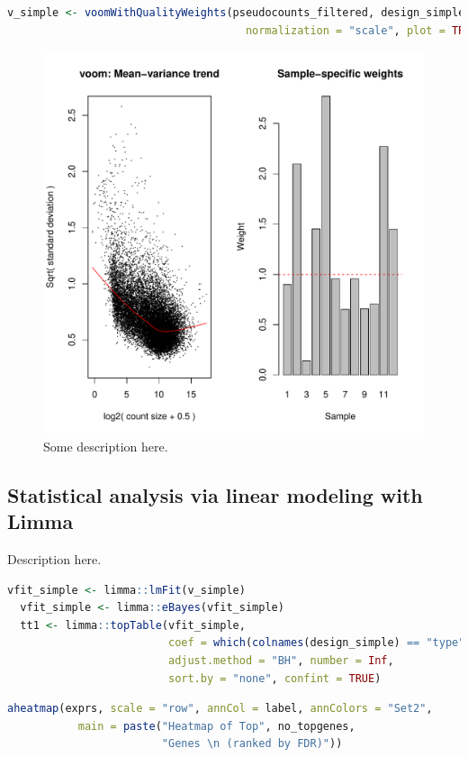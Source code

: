 \documentclass[11pt]{article}
\begin{document}
\begin{lstlisting}[language=R]
  v_simple <- voomWithQualityWeights(pseudocounts_filtered, design_simple,
                                     normalization = "scale", plot = TRUE)
\end{lstlisting}

\begin{figure}[H]
\centering
\includegraphics[scale=0.8]{voomTrend_simplemod.pdf}
\caption{Some description here.}
\end{figure}


\subsection{Statistical analysis via linear modeling with Limma}
Description here.

\begin{lstlisting}[language=R]
  vfit_simple <- limma::lmFit(v_simple)
  vfit_simple <- limma::eBayes(vfit_simple)
  tt1 <- limma::topTable(vfit_simple,
                         coef = which(colnames(design_simple) == "type"),
                         adjust.method = "BH", number = Inf,
                         sort.by = "none", confint = TRUE)
\end{lstlisting}

\begin{lstlisting}[language=R]
  aheatmap(exprs, scale = "row", annCol = label, annColors = "Set2",
           main = paste("Heatmap of Top", no_topgenes,
                        "Genes \n (ranked by FDR)"))
\end{lstlisting}
\end{document}
